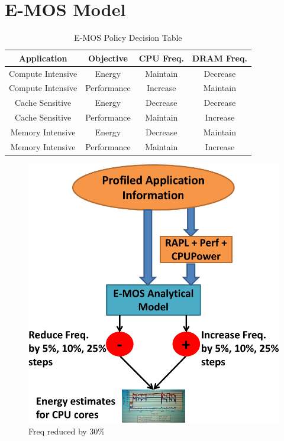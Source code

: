 \section{E-MOS Model}\label{sec:analytic}



\begin{table}[h]
\footnotesize
\def\arraystretch{0.52}
\setlength{\tabcolsep}{.30em}
\center
\begin{tabular}{cccc} \toprule
Application & Objective & CPU Freq. & DRAM Freq.  \\ \midrule
Compute Intensive & Energy & Maintain & Decrease \\
Compute Intensive & Performance & Increase & Maintain \\
Cache Sensitive & Energy &  Decrease & Decrease \\ 
Cache Sensitive & Performance &  Maintain & Increase \\ 
Memory Intensive & Energy & Decrease & Maintain \\
Memory Intensive & Performance & Maintain & Increase \\ \midrule

\end{tabular}
\caption{E-MOS Policy Decision Table}\label{tbl:emos-dec}
\end{table}


\begin{figure}[h]
  \begin{center}
\includegraphics[width=\linewidth]{figs/EMOS-new-crop.pdf}
  \end{center}
  \vspace{-0.1in}
  \caption{Freq reduced by 30\%}
	\label{fig:reduce-freq}
\end{figure}

